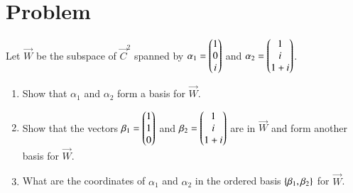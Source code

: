 \documentclass[journal,12pt,twocolumn]{IEEEtran}
\begin{document}
\section{Problem}
Let $\vec{W}$ be the subspace of $\vec{C}^2$ spanned by 
$\alpha_1=\begin{pmatrix}1\\0\\i\end{pmatrix}$ and $\alpha_2=\begin{pmatrix}1\\i\\1+i\end{pmatrix}$.
\begin{enumerate}[label=\emph{\alph*)}]
	\item Show that $\alpha_1$ and $\alpha_2$ form a basis for $\vec{W}$.\\
	\item Show that the vectors $\beta_1=\begin{pmatrix}1\\1\\0\end{pmatrix}$ and 
		$\beta_2=\begin{pmatrix}1\\i\\1+i\end{pmatrix}$ are in $\vec{W}$ and form another
		basis for $\vec{W}$. \\
	\item What are the coordinates of $\alpha_1$ and $\alpha_2$ in the
		ordered basis $\left\{\beta_1, \beta_2\right\} $ for $\vec{W}$.
\end{enumerate}
\end{document}
